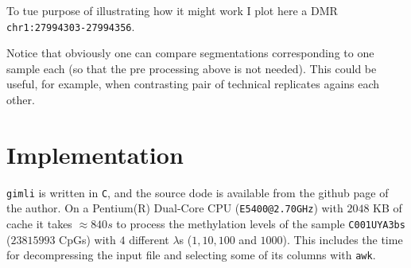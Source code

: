 \documentclass[12pt]{amsart}
\newcommand{\gimli}{\texttt{gimli}}
\begin{document}
To tue purpose of illustrating how it might work I plot here a DMR 
\texttt{chr1:27994303-27994356}.

Notice that obviously one can compare segmentations corresponding to one sample
each (so that the pre processing above is not needed). This could be useful, for example, 
when contrasting pair of technical replicates agains each other.

\section{Implementation}

\gimli{} is written in \texttt{C}, and the source
dode is available from the github page of the author. 
On a Pentium(R) Dual-Core  CPU (\texttt{E5400@2.70GHz})
with $2048$ KB of cache it takes $\approx 840s$ to process the 
methylation levels of the sample \texttt{C001UYA3bs} ($23815993$ CpGs) 
with $4$ different $\lambda$s ($1,10,100$ and $1000$).
This includes the time for decompressing the input file and selecting some of its columns
with \texttt{awk}.




\end{document}
